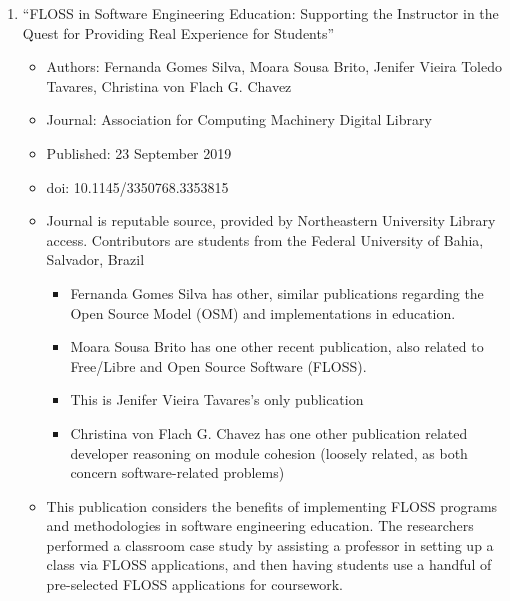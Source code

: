 \begin{enumerate}

  \item ``FLOSS in Software Engineering Education: Supporting the Instructor in the Quest for Providing Real Experience for Students''

    \begin{itemize}

      \item Authors: Fernanda Gomes Silva, Moara Sousa Brito, Jenifer Vieira Toledo Tavares, Christina von Flach G. Chavez

      \item Journal: Association for Computing Machinery Digital Library

      \item Published: 23 September 2019

      \item doi: 10.1145/3350768.3353815

      \item Journal is reputable source, provided by Northeastern University Library access. Contributors are students from the Federal University of Bahia, Salvador, Brazil

        \begin{itemize}

          \item Fernanda Gomes Silva has other, similar publications regarding the Open Source Model (OSM) and implementations in education.

          \item Moara Sousa Brito has one other recent publication, also related to Free/Libre and Open Source Software (FLOSS).

          \item This is Jenifer Vieira Tavares's only publication

          \item Christina von Flach G. Chavez has one other publication related developer reasoning on module cohesion (loosely related, as both concern software-related problems)

        \end{itemize}

      \item This publication considers the benefits of implementing FLOSS programs and methodologies in software engineering education. The researchers performed a classroom case study by assisting a professor in setting up a class via FLOSS applications, and then having students use a handful of pre-selected FLOSS applications for coursework. 


\end{itemize}
\end{enumerate}
